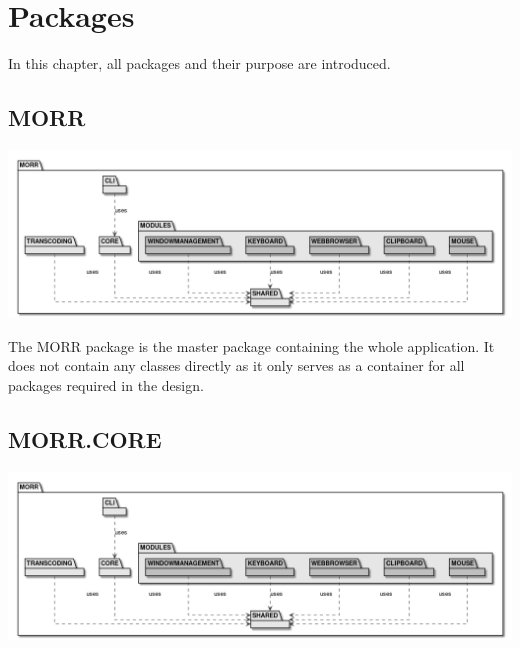 \chapter{Packages}
\label{ch:package}
\newenvironment{packclass}[0]{\textbf{Contained classes:} \begin{itemize}
}{\end{itemize}}
\newenvironment{packenum}[0]{\textbf{Contained enums:} \begin{itemize}
}{\end{itemize}}
\newenvironment{packif}[0]{\textbf{Contained interfaces:} \begin{itemize}
}{\end{itemize}}
\newenvironment{packpack}[0]{\textbf{Contained packages:} \begin{itemize}
}{\end{itemize}}
\newcommand{\packobj}[1]{\item #1}
\newcommand{\abstract}[1]{\textit{abstract} #1}

In this chapter, all packages and their purpose are introduced.

\section{MORR}

\begin{center}
    \includegraphics[width=1.0\textwidth]{resources/Packages/AllPackages.png}
\end{center}

The MORR package is the master package containing the whole application. It does not contain any classes directly as it only serves as a container for all packages required in the design.

\newpage
\section{MORR.CORE}

\begin{center}
    \includegraphics[width=1.0\textwidth]{resources/Packages/AllPackages.png}
\end{center}


